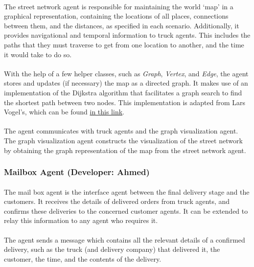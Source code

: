 \documentclass[11pt, a4paper]{article}
\begin{document}
\paragraph{}
The street network agent is responsible for maintaining the world `map' in a graphical representation, containing the locations of all places, connections between them, and the distances, as specified in each scenario. Additionally, it provides navigational and temporal information to truck agents. This includes the paths that they must traverse to get from one location to another, and the time it would take to do so.
\paragraph{}
With the help of a few helper classes, such as \textit{Graph}, \textit{Vertex}, and \textit{Edge}, the agent stores and updates (if necessary) the map as a directed graph. It makes use of an implementation of the Dijkstra algorithm that facilitates a graph search to find the shortest path between two nodes. This implementation is adapted from Lars Vogel's, which can be found \href{http://www.vogella.com/tutorials/JavaAlgorithmsDijkstra/article.html}{in this link}.
\paragraph{}
The agent communicates with truck agents and the graph visualization agent. The graph visualization agent constructs the visualization of the street network by obtaining the graph representation of the map from the street network agent.
\subsubsection{Mailbox Agent (Developer: Ahmed)}
\paragraph{}
The mail box agent is the interface agent between the final delivery stage and the customers. It receives the details of delivered orders from truck agents, and confirms these deliveries to the concerned customer agents. It can be extended to relay this information to any agent who requires it.
\paragraph{}
The agent sends a message which contains all the relevant details of a confirmed delivery, such as the truck (and delivery company) that delivered it, the customer, the time, and the contents of the delivery.
\end{document}
